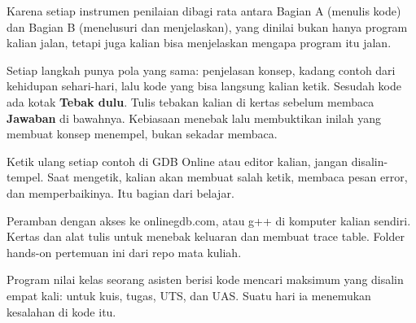 \documentclass[a4paper]{article}
\begin{document}
\par\vspace{4pt}\par\vspace{6pt}
Karena setiap instrumen penilaian dibagi rata antara Bagian A (menulis kode) dan Bagian B (menelusuri dan menjelaskan), yang dinilai bukan hanya program kalian jalan, tetapi juga kalian bisa menjelaskan mengapa program itu jalan.

Setiap langkah punya pola yang sama: penjelasan konsep, kadang contoh dari kehidupan sehari-hari, lalu kode yang bisa langsung kalian ketik. Sesudah kode ada kotak \textbf{Tebak dulu}. Tulis tebakan kalian di kertas sebelum membaca \textbf{Jawaban} di bawahnya. Kebiasaan menebak lalu membuktikan inilah yang membuat konsep menempel, bukan sekadar membaca.

\begin{Penting}
Ketik ulang setiap contoh di GDB Online atau editor kalian, jangan disalin-tempel. Saat mengetik, kalian akan membuat salah ketik, membaca pesan error, dan memperbaikinya. Itu bagian dari belajar.
\end{Penting}
Peramban dengan akses ke onlinegdb.com, atau g++ di komputer kalian sendiri. Kertas dan alat tulis untuk menebak keluaran dan membuat trace table. Folder hands-on pertemuan ini dari repo mata kuliah.

Program nilai kelas seorang asisten berisi kode mencari maksimum yang disalin empat kali: untuk kuis, tugas, UTS, dan UAS. Suatu hari ia menemukan kesalahan di kode itu.
\end{document}

